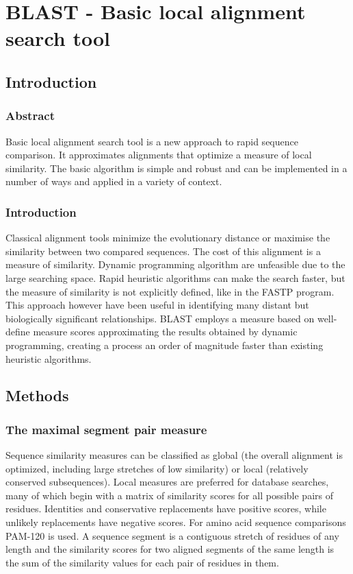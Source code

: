 \chapter{BLAST - Basic local alignment search tool}

\section{Introduction}

	\subsection{Abstract}
	Basic local alignment search tool is a new approach to rapid sequence comparison.
	It approximates alignments that optimize a measure of local similarity.
	The basic algorithm is simple and robust and can be implemented in a number of ways and applied in a variety of context.

	\subsection{Introduction}
	Classical alignment tools minimize the evolutionary distance or maximise the similarity between two compared sequences.
	The cost of this alignment is a measure of similarity.
	Dynamic programming algorithm are unfeasible due to the large searching space.
	Rapid heuristic algorithms can make the search faster, but the measure of similarity is not explicitly defined, like in the FASTP program.
	This approach however have been useful in identifying many distant but biologically significant relationships.
	BLAST employs a measure based on well-define measure scores approximating the results obtained by dynamic programming, creating a process an order of magnitude faster than existing heuristic algorithms.

\section{Methods}

	\subsection{The maximal segment pair measure}
	Sequence similarity measures can be classified as global (the overall alignment is optimized, including large stretches of low similarity) or local (relatively conserved subsequences).
	Local measures are preferred for database searches, many of which begin with a matrix of similarity scores for all possible pairs of residues.
	Identities and conservative replacements have positive scores, while unlikely replacements have negative scores.
	For amino acid sequence comparisons PAM-120 is used.
	A sequence segment is a contiguous stretch of residues of any length and the similarity scores for two aligned segments of the same length is the sum of the similarity values for each pair of residues in them.

